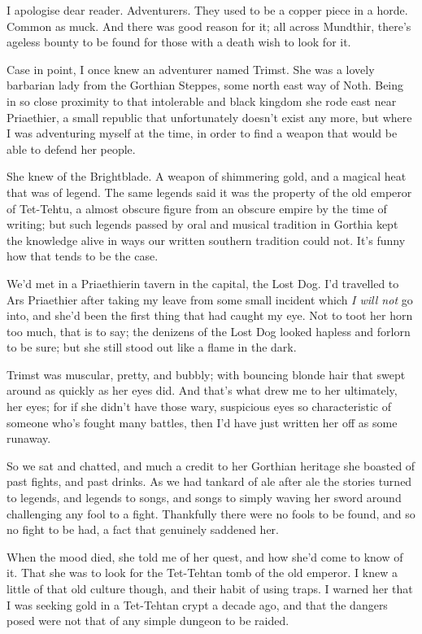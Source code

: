 \documentclass[12pt, a4paper]{book}
\begin{document}
I apologise dear reader. Adventurers. They used to be a copper piece in a horde. Common as muck. And there was good reason for it; all across Mundthir, there's ageless bounty to be found for those with a death wish to look for it. 

Case in point, I once knew an adventurer named Trimst. She was a lovely barbarian lady from the Gorthian Steppes, some north east way of Noth. Being in so close proximity to that intolerable and black kingdom she rode east near Priaethier, a small republic that unfortunately doesn't exist any more, but where I was adventuring myself at the time, in order to find a weapon that would be able to defend her people.

She knew of the Brightblade. A weapon of shimmering gold, and a magical heat that was of legend. The same legends said it was the property of the old emperor of Tet-Tehtu, a almost obscure figure from an obscure empire by the time of writing; but such legends passed by oral and musical tradition in Gorthia kept the knowledge alive in ways our written southern tradition could not. It's funny how that tends to be the case.

We'd met in a Priaethierin tavern in the capital, the Lost Dog. I'd travelled to Ars Priaethier after taking my leave from some small incident which \textit{I will not} go into, and she'd been the first thing that had caught my eye. Not to toot her horn too much, that is to say; the denizens of the Lost Dog looked hapless and forlorn to be sure; but she still stood out like a flame in the dark.

Trimst was muscular, pretty, and bubbly; with bouncing blonde hair that swept around as quickly as her eyes did. And that's what drew me to her ultimately, her eyes; for if she didn't have those wary, suspicious eyes so characteristic of someone who's fought many battles, then I'd have just written her off as some runaway.

So we sat and chatted, and much a credit to her Gorthian heritage she boasted of past fights, and past drinks. As we had tankard of ale after ale the stories turned to legends, and legends to songs, and songs to simply waving her sword around challenging any fool to a fight. Thankfully there were no fools to be found, and so no fight to be had, a fact that genuinely saddened her.

When the mood died, she told me of her quest, and how she'd come to know of it. That she was to look for the Tet-Tehtan tomb of the old emperor. I knew a little of that old culture though, and their habit of using traps. I warned her that I was seeking gold in a Tet-Tehtan crypt a decade ago, and that the dangers posed were not that of any simple dungeon to be raided.
\end{document}
